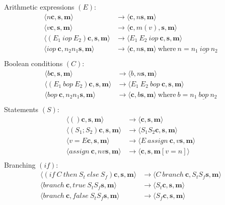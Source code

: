 \documentclass[11pt]{report}
\begin{document}
Arithmetic expressions $(E)$:
\begin{align*}
\langle n  \bm{c},  \bm{s},  \bm{m} \rangle  &\rightarrow   \langle  \bm{c}, n  \bm{s},  \bm{m} \rangle \\
\langle v  \bm{c},  \bm{s},  \bm{m} \rangle    &\rightarrow   \langle  \bm{c},  m(v),  \bm{s},  \bm{m} \rangle \\
\langle (E_1\ iop \ E_2)  \bm{c},  \bm{s},  \bm{m} \rangle    &\rightarrow   \langle E_1\  E_2\  iop  \ \bm{c},  \bm{s},  \bm{m} \rangle \\
\langle iop \ \bm{c}, n_2 n_1  \bm{s},  \bm{m} \rangle    &\rightarrow   \langle  \bm{c}, n  \bm{s},  \bm{m} \rangle  \ \text{where} \ n = n_1\ \underline{iop} \ n_2 \\
\end{align*}
Boolean conditions $(C)$:
\begin{align*}
\langle b  \bm{c},  \bm{s},  \bm{m} \rangle    &\rightarrow   \langle b, n  \bm{s},  \bm{m} \rangle \\
\langle (E_1 \ bop \ E_2)  \bm{c},  \bm{s},  \bm{m} \rangle    &\rightarrow   \langle E_1\ E_2\ bop \ \bm{c},  \bm{s},  \bm{m} \rangle \\
\langle bop \  \bm{c}, n_2 n_1  \bm{s},  \bm{m} \rangle    &\rightarrow   \langle  \bm{c}, b  \bm{s},  \bm{m} \rangle \  \text{where} \ b = n_1\ \underline{bop}\ n_2\\
\end{align*}
Statements $(S)$:
\begin{align*}
\langle ()  \bm{c},  \bm{s},  \bm{m} \rangle    &\rightarrow   \langle  \bm{c},  \bm{s},  \bm{m} \rangle \\
\langle (S_1 ; S_2)  \bm{c},  \bm{s},  \bm{m} \rangle    &\rightarrow   \langle S_1 S_2  \bm{c},  \bm{s},  \bm{m} \rangle \\
\langle v=E  \bm{c},  \bm{s},  \bm{m} \rangle    &\rightarrow   \langle E\ assign\  \bm{c}, v  \bm{s},  \bm{m} \rangle \\
\langle assign \  \bm{c}, n v  \bm{s},  \bm{m} \rangle    &\rightarrow   \langle  \bm{c},  \bm{s},  \bm{m}[v=n] \rangle \\
\end{align*}
Branching $(if)$:
\begin{align*}
\langle (if\ C\ then\ S_t\ else\ S_f)  \bm{c},  \bm{s},  \bm{m} \rangle    &\rightarrow   \langle C\ branch\  \bm{c}, S_t S_f  \bm{s},  \bm{m} \rangle \\
\langle branch\  \bm{c}, true\  S_t S_f  \bm{s},  \bm{m} \rangle    &\rightarrow   \langle S_t  \bm{c},  \bm{s},  \bm{m} \rangle \\
\langle branch\  \bm{c}, false\ S_t S_f  \bm{s},  \bm{m} \rangle    &\rightarrow   \langle S_f  \bm{c},  \bm{s},  \bm{m} \rangle \\
\end{align*}
\end{document}

